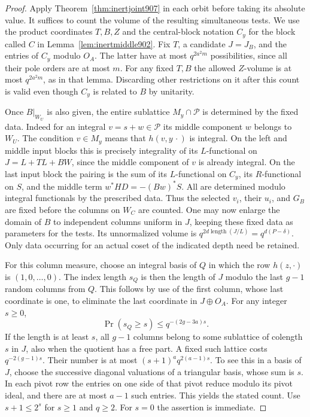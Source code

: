 \documentclass[a4paper,11pt]{article}
\theoremstyle{definition}
\theoremstyle{remark}
\numberwithin{equation}{section}
\begin{document}
\begin{proof}
Apply Theorem~\ref{thm:inertjoint907} in each orbit before taking
its absolute value. It suffices to count the volume of the
resulting simultaneous tests. We use the product coordinates
\(T,B,Z\) and the central-block notation \(C_y\) for the block
called \(C\) in Lemma~\ref{lem:inertmiddle902}. Fix \(T\), a
candidate \(J=J_B\), and the entries of \(C_y\) modulo \(O_A\).
The latter have at most \(q^{2a^2m}\) possibilities, since all
their pole orders are at most \(m\). For any fixed \(T,B\) the
allowed \(Z\)-volume is at most \(q^{2a^2m}\), as in that lemma.
Discarding other restrictions on it after this count is valid
even though \(C_y\) is related to \(B\) by unitarity.

Once \(B|_{W_U}\) is also given, the entire sublattice
\(M_y\cap\mathcal P\) is determined by the fixed data.
Indeed for an integral \(v=s+w\in\mathcal P\) its middle
component \(w\) belongs to \(W_U\).
The condition \(v\in M_y\) means that \(h(v,y\,\cdot)\) is
integral. On the left and middle input blocks this is precisely
integrality of its \(L\)-functional on \(J=L+TL+BW\), since the
middle component of \(v\) is already integral. On the last
input block the pairing is the sum of its \(L\)-functional on
\(C_y\), its \(R\)-functional on \(S\), and the middle term
\(w^*HD=-(Bw)^*S\). All are determined modulo integral
functionals by the prescribed data. Thus the selected \(v_i\),
their \(u_i\), and \(G_B\) are fixed before the columns on
\(W_C\) are counted. One may now enlarge the domain of \(B\)
to independent columns uniform in \(J\), keeping these fixed
data as parameters for the tests. Its unnormalized volume is
\(q^{2d\operatorname{length}(J/L)}=q^{d(P-\delta)}\).
Only data occurring for an actual coset of the indicated
depth need be retained.

For this column measure, choose an integral basis of \(Q\)
in which the row \(h(z,\cdot)\) is \((1,0,\ldots,0)\).
The index length \(s_Q\) is then the length of \(J\) modulo
the last \(g-1\) random columns from \(Q\). This follows by
use of the first column, whose last coordinate is one, to
eliminate the last coordinate in \(J\oplus O_A\).
For any integer \(s\ge0\),
\begin{equation}
                    \Pr(s_Q\ge s)\le q^{-(2g-3a)s}.
 \label{eq:inertindex908}
\end{equation}
If the length is at least \(s\), all \(g-1\) columns belong
to some sublattice of colength \(s\) in \(J\), also when the
quotient has a free part. A fixed such lattice costs
\(q^{-2(g-1)s}\). Their number is at most
\((s+1)^a q^{2(a-1)s}\). To see this in a basis of \(J\),
choose the successive diagonal valuations of a triangular
basis, whose sum is \(s\). In each pivot row the entries on
one side of that pivot reduce modulo its pivot ideal, and
there are at most \(a-1\) such entries. This yields the stated
count. Use \(s+1\le 2^s\) for \(s\ge1\) and \(q\ge2\).
For \(s=0\) the assertion is immediate.


\end{proof}
\end{document}
